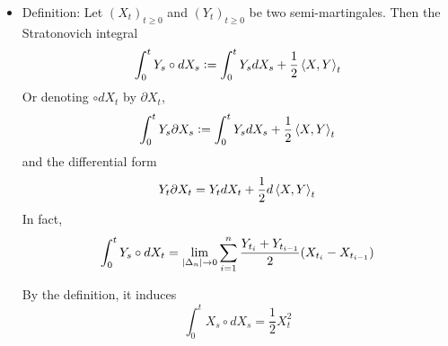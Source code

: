 \documentclass[a4paper,12pt]{article}
\begin{document}
\begin{itemize}
  \item Definition: Let $(X_t)_{t\geqslant 0}$ and $(Y_t)_{t\geqslant 0}$ be two semi-martingales. Then the Stratonovich integral
  \begin{equation*}
    \int_0^t Y_s \circ dX_s \vcentcolon= \int_0^t Y_s dX_s + \frac{1}{2}\left\langle X,Y \right\rangle_t
  \end{equation*}
  Or denoting $\circ dX_t$ by $\partial X_t$,
  \begin{equation*}
    \int_0^t Y_s \partial X_s \vcentcolon= \int_0^t Y_s dX_s + \frac{1}{2}\left\langle X,Y \right\rangle_t
  \end{equation*}
  and the differential form
  \begin{equation*}
    Y_t \partial X_t = Y_t dX_t + \frac{1}{2}d\left\langle X,Y \right\rangle_t
  \end{equation*}
  In fact,
  \begin{equation*}
    \int_0^t Y_s \circ dX_t = \lim_{\left\lvert\Delta_n\right\lvert \rightarrow 0} \sum_{i=1}^n\frac{Y_{t_i}+Y_{t_{i-1}}}{2}(X_{t_i}-X_{t_{i-1}})
  \end{equation*}
  \begin{rmk}
    By the definition, it induces
    \begin{equation*}
      \int_0^t X_s \circ dX_s = \frac{1}{2}X_t^2
    \end{equation*}
  \end{rmk}


\end{itemize}
\end{document}
